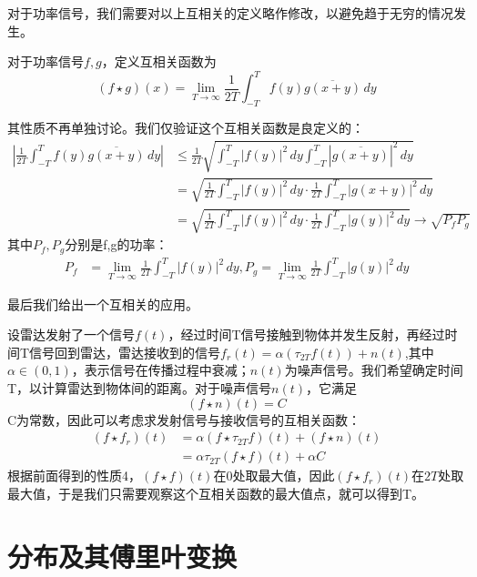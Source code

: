 \documentclass{ctexbook}
\begin{document}
对于功率信号，我们需要对以上互相关的定义略作修改，以避免趋于无穷的情况发生。
\begin{definition}[功率信号的互相关]
    对于功率信号$f,g$，定义互相关函数为
\begin{equation}
    (f\star g)(x)=\lim_{T\to\infty}\frac{1}{2T}\int_{-T}^{T}f(y)\overline{g(x+y)}\,dy
\end{equation}
\end{definition}
其性质不再单独讨论。我们仅验证这个互相关函数是良定义的：
\begin{align*}
    \left|\frac{1}{2T}\int_{-T}^{T}f(y)\overline{g(x+y)}\,dy\right|& \leq \frac{1}{2T}\sqrt{\int_{-T}^{T}|f(y)|^2\,dy\int_{-T}^{T}\left|\overline{g(x+y)}\right|^2\,dy}\\
    & =\sqrt{\frac{1}{2T}\int_{-T}^{T}|f(y)|^2\,dy\cdot\frac{1}{2T}\int_{-T}^{T}|g(x+y)|^2\,dy}\\
    & =\sqrt{\frac{1}{2T}\int_{-T}^{T}|f(y)|^2\,dy\cdot\frac{1}{2T}\int_{-T}^{T}|g(y)|^2\,dy}\to \sqrt{P_f P_g}
\end{align*}
其中$P_f,P_g$分别是f,g的功率：\begin{align*}
P_f&=\lim_{T\to\infty}\frac{1}{2T}\int_{-T}^{T}|f(y)|^2\,dy,P_g=\lim_{T\to\infty}\frac{1}{2T}\int_{-T}^{T}|g(y)|^2\,dy
\end{align*}

最后我们给出一个互相关的应用\cite{brad_osgood_ee261}。
\begin{example}[雷达测距]
    设雷达发射了一个信号$f(t)$，经过时间T信号接触到物体并发生反射，再经过时间T信号回到雷达，雷达接收到的信号$f_r(t)=\alpha (\tau_{2T}f(t))+n(t)$,其中$\alpha\in(0,1)$，表示信号在传播过程中衰减；$n(t)$为噪声信号。我们希望确定时间T，以计算雷达到物体间的距离。对于噪声信号$n(t)$，它满足
    \[(f\star n)(t)=C\]
    C为常数，因此可以考虑求发射信号与接收信号的互相关函数：
    \begin{align*}
        (f\star f_r)(t)&=\alpha(f\star \tau_{2T}f)(t)+(f\star n)(t)\\
        &=\alpha\tau_{2T}(f\star f)(t)+\alpha C
    \end{align*}
    根据前面得到的性质4，$(f\star f)(t)$在0处取最大值，因此$(f\star f_r)(t)$在$2T$处取最大值，于是我们只需要观察这个互相关函数的最大值点，就可以得到T。
\end{example}

\section{分布及其傅里叶变换}\label{sec:Distributions}
\end{document}

